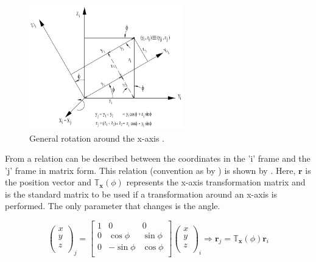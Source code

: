 

\begin{figure}[!ht]
\centering
\includegraphics[width=0.6\textwidth]{figures/reference_frames/xtrans_mooij2013stat.jpg}
\caption{General rotation around the x-axis \cite{mooij2013stat}.}
\label{fig:xtrans_mooij2013stat}
\end{figure}

From   a relation can be described between the coordinates in the 'i' frame and the 'j' frame in matrix form. This relation (convention as by \cite{mooij2013stat}) is shown by . Here, $\mathbf{r}$ is the position vector and $\mathbb{T}_{\mathbf{x}}(\phi)$ represents the x-axis transformation matrix and is the standard matrix to be used if a transformation around an x-axis is performed. The only parameter that changes is the angle.


\begin{equation} \label{eq:xaxistransmatr}
\begin{pmatrix}
x\\
y\\
z\\
\end{pmatrix}_{j}=
\begin{bmatrix}
1 & 0 & 0 \\
0 & \cos\phi & \sin\phi \\
0 & -\sin\phi & \cos\phi \\
\end{bmatrix}
\begin{pmatrix}
x\\
y\\
z\\
\end{pmatrix}_{i}\Rightarrow
\mathbf{r}_{j}=\mathbb{T}_{\mathbf{x}}(\phi)\mathbf{r}_{i}
\end{equation}


